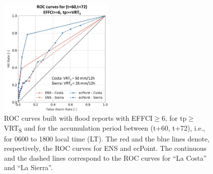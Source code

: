 \documentclass[techmemo]{ecmwfrep}%
\begin{document}
\begin{figure}
\centering
\includegraphics[width=0.5\textwidth]{Figures/11_RESULTS_ROCs.png}
\caption{ROC curves built with flood reports with EFFCI$\geq$6, for tp$\geq$VRT\textsubscript{S} and for the accumulation period between (t+60, t+72), i.e., for 0600 to 1800 local time (LT). The red and the blue lines denote, respectively, the ROC curves for ENS and ecPoint. The continuous and the dashed lines correspond to the ROC curves for “La Costa” and “La Sierra”.}
\label{fig:ROC}
\end{figure}
\end{document}
